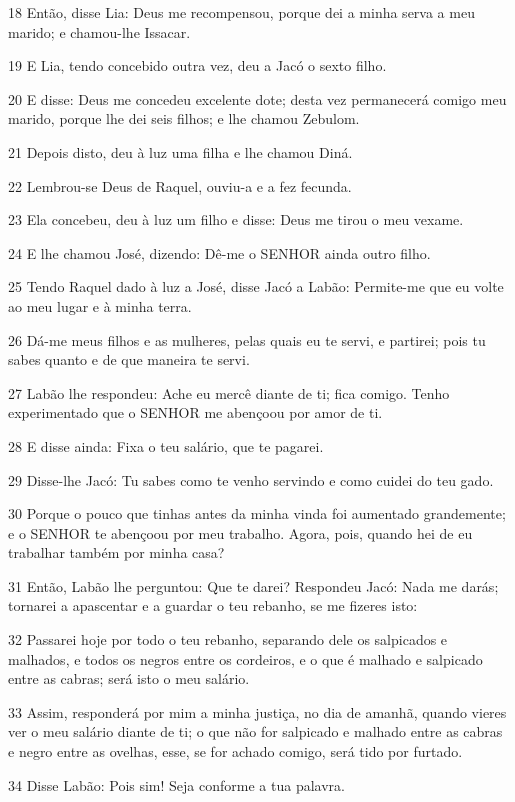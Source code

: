 \par 18 Então, disse Lia: Deus me recompensou, porque dei a minha serva a meu marido; e chamou-lhe Issacar.
\par 19 E Lia, tendo concebido outra vez, deu a Jacó o sexto filho.
\par 20 E disse: Deus me concedeu excelente dote; desta vez permanecerá comigo meu marido, porque lhe dei seis filhos; e lhe chamou Zebulom.
\par 21 Depois disto, deu à luz uma filha e lhe chamou Diná.
\par 22 Lembrou-se Deus de Raquel, ouviu-a e a fez fecunda.
\par 23 Ela concebeu, deu à luz um filho e disse: Deus me tirou o meu vexame.
\par 24 E lhe chamou José, dizendo: Dê-me o SENHOR ainda outro filho.
\par 25 Tendo Raquel dado à luz a José, disse Jacó a Labão: Permite-me que eu volte ao meu lugar e à minha terra.
\par 26 Dá-me meus filhos e as mulheres, pelas quais eu te servi, e partirei; pois tu sabes quanto e de que maneira te servi.
\par 27 Labão lhe respondeu: Ache eu mercê diante de ti; fica comigo. Tenho experimentado que o SENHOR me abençoou por amor de ti.
\par 28 E disse ainda: Fixa o teu salário, que te pagarei.
\par 29 Disse-lhe Jacó: Tu sabes como te venho servindo e como cuidei do teu gado.
\par 30 Porque o pouco que tinhas antes da minha vinda foi aumentado grandemente; e o SENHOR te abençoou por meu trabalho. Agora, pois, quando hei de eu trabalhar também por minha casa?
\par 31 Então, Labão lhe perguntou: Que te darei? Respondeu Jacó: Nada me darás; tornarei a apascentar e a guardar o teu rebanho, se me fizeres isto:
\par 32 Passarei hoje por todo o teu rebanho, separando dele os salpicados e malhados, e todos os negros entre os cordeiros, e o que é malhado e salpicado entre as cabras; será isto o meu salário.
\par 33 Assim, responderá por mim a minha justiça, no dia de amanhã, quando vieres ver o meu salário diante de ti; o que não for salpicado e malhado entre as cabras e negro entre as ovelhas, esse, se for achado comigo, será tido por furtado.
\par 34 Disse Labão: Pois sim! Seja conforme a tua palavra.
